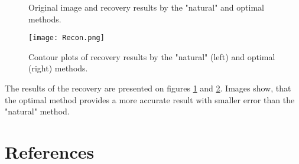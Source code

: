 \documentclass[12pt]{iopart}
\begin{document}
	\begin{figure}[H]
		\caption{Original image and recovery results by the "natural" and optimal methods.}
		\label{1}
	\end{figure}
	
	\begin{figure}[h]
		{\texttt{[image: Recon.png]}}
		\caption{Contour plots of recovery results by the "natural" (left) and optimal (right) methods.}
		\label{2}
	\end{figure}
The results of the recovery are presented on figures \ref{1} and \ref{2}. Images show, that the optimal method provides a more accurate result with smaller error than the "natural" method.
	
	
	\section*{References}
	
	
	
\end{document}
